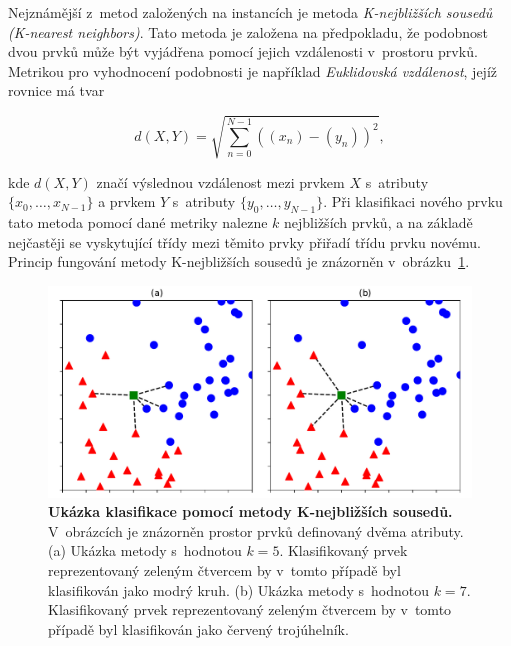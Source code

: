 Nejznámější z~metod založených na instancích je metoda \textit{K-nejbližších sousedů (K-nearest neighbors)}. Tato metoda je založena na předpokladu, že podobnost dvou prvků může být vyjádřena pomocí jejich vzdálenosti v~prostoru prvků. Metrikou pro vyhodnocení podobnosti je například \textit{Euklidovská vzdálenost}, jejíž rovnice má tvar

\begin{equation}
    d(X, Y) = \sqrt{\sum\limits_{n=0}^{N-1} ((x_n)-(y_n))^2},
\end{equation}

\medskip

\noindent kde $d(X, Y)$ značí výslednou vzdálenost mezi prvkem $X$ s~atributy $\{x_0, \dots, x_{N-1}\}$ a prvkem $Y$ s~atributy $\{y_0, \dots, y_{N-1}\}$. Při klasifikaci nového prvku tato metoda pomocí dané metriky nalezne $k$ nejbližších prvků, a na základě nejčastěji se vyskytující třídy mezi těmito prvky přiřadí třídu prvku novému. Princip fungování metody K-nejbližších sousedů je znázorněn v~obrázku~\ref{obr_knn}.\cite{strojove_uceni}\cite{machine_learning}

\begin{figure}[h]
    \centering
    \includegraphics[width=\textwidth]{obrazky/knn.pdf}
    \caption{\textbf{Ukázka klasifikace pomocí metody K-nejbližších sousedů.} V~obrázcích je znázorněn prostor prvků definovaný dvěma atributy. (a) Ukázka metody s~hodnotou $k = 5$. Klasifikovaný prvek reprezentovaný zeleným čtvercem by v~tomto případě byl klasifikován jako modrý kruh. (b) Ukázka metody s~hodnotou $k = 7$. Klasifikovaný prvek reprezentovaný zeleným čtvercem by v~tomto případě byl klasifikován jako červený trojúhelník.}
    \label{obr_knn}
\end{figure}

